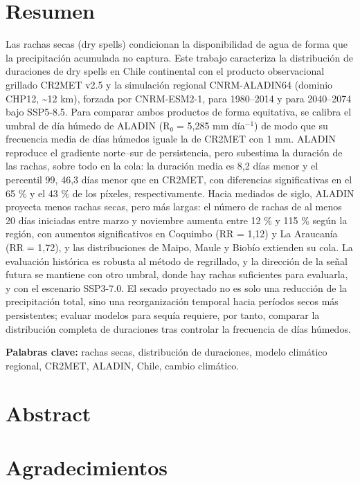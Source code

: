 \chapter*{Resumen}
Las rachas secas (dry spells) condicionan la disponibilidad de agua de forma que la precipitación acumulada no captura. Este trabajo caracteriza la distribución de duraciones de dry spells en Chile continental con el producto observacional grillado CR2MET v2.5 y la simulación regional CNRM-ALADIN64 (dominio CHP12, \textasciitilde12 km), forzada por CNRM-ESM2-1, para 1980--2014 y para 2040--2074 bajo SSP5-8.5. Para comparar ambos productos de forma equitativa, se calibra el umbral de día húmedo de ALADIN (R₀ = 5,285 mm día$^{-1}$) de modo que su frecuencia media de días húmedos iguale la de CR2MET con 1 mm. ALADIN reproduce el gradiente norte--sur de persistencia, pero subestima la duración de las rachas, sobre todo en la cola: la duración media es 8,2 días menor y el percentil 99, 46,3 días menor que en CR2MET, con diferencias significativas en el 65 \% y el 43 \% de los píxeles, respectivamente. Hacia mediados de siglo, ALADIN proyecta menos rachas secas, pero más largas: el número de rachas de al menos 20 días iniciadas entre marzo y noviembre aumenta entre 12 \% y 115 \% según la región, con aumentos significativos en Coquimbo (RR = 1,12) y La Araucanía (RR = 1,72), y las distribuciones de Maipo, Maule y Biobío extienden su cola. La evaluación histórica es robusta al método de regrillado, y la dirección de la señal futura se mantiene con otro umbral, donde hay rachas suficientes para evaluarla, y con el escenario SSP3-7.0. El secado proyectado no es solo una reducción de la precipitación total, sino una reorganización temporal hacia períodos secos más persistentes; evaluar modelos para sequía requiere, por tanto, comparar la distribución completa de duraciones tras controlar la frecuencia de días húmedos.

\textbf{Palabras clave:} rachas secas, distribución de duraciones, modelo climático regional, CR2MET, ALADIN, Chile, cambio climático.

\chapter*{Abstract}

\chapter*{Agradecimientos}


